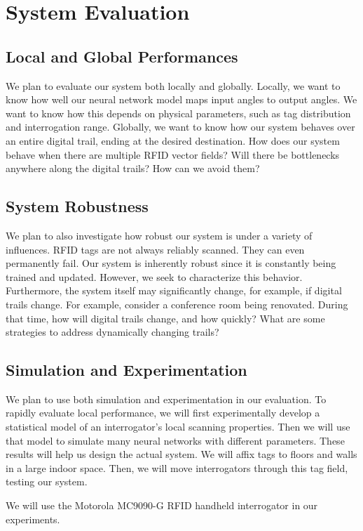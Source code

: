 \documentclass[conference]{IEEEtran}
\begin{document}
\section{System Evaluation}
\label{Section: System Evaluation}
\subsection{Local and Global Performances}
We plan to evaluate our system both locally and globally. Locally, we want to know how well our neural network model maps input angles to output angles. We want to know how this depends on physical parameters, such as tag distribution and interrogation range. Globally, we want to know how our system behaves over an entire digital trail, ending at the desired destination. How does our system behave when there are multiple RFID vector fields? Will there be bottlenecks anywhere along the digital trails? How can we avoid them?

\subsection{System Robustness}
We plan to also investigate how robust our system is under a variety of influences. RFID tags are not always reliably scanned. They can even permanently fail. Our system is inherently robust since it is constantly being trained and updated. However, we seek to characterize this behavior. Furthermore, the system itself may significantly change, for example, if digital trails change. For example, consider a conference room being renovated. During that time, how will digital trails change, and how quickly? What are some strategies to address dynamically changing trails?

\subsection{Simulation and Experimentation}
We plan to use both simulation and experimentation in our evaluation. To rapidly evaluate local performance, we will first experimentally develop a statistical model of an interrogator's local scanning properties. Then we will use that model to simulate many neural networks with different parameters. These results will help us design the actual system. We will affix tags to floors and walls in a large indoor space. Then, we will move interrogators through this tag field, testing our system.

We will use the Motorola MC9090-G RFID handheld interrogator \cite{Motorola} in our experiments.
\end{document}
